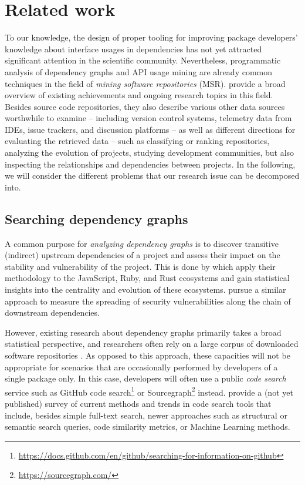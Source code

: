\section{Related work}
\label{sec:related_work}

To our knowledge, the design of proper tooling for improving package developers' knowledge about interface usages in dependencies has not yet attracted significant attention in the scientific community.
Nevertheless, programmatic analysis of dependency graphs and API usage mining are already common techniques in the field of \emph{mining software repositories} (MSR).
\citet{chaturvedi2013tools} provide a broad overview of existing achievements and ongoing research topics in this field.
Besides source code repositories, they also describe various other data sources worthwhile to examine -- including version control systems, telemetry data from IDEs, issue trackers, and discussion platforms -- as well as different directions for evaluating the retrieved data -- such as classifying or ranking repositories, analyzing the evolution of projects, studying development communities, but also inspecting the relationships and dependencies between projects.
In the following, we will consider the different problems that our research issue can be decomposed into.

\subsection{Searching dependency graphs}
\label{sec:related_work/dependencies}

A common purpose for \emph{analyzing dependency graphs} is to discover transitive (indirect) upstream dependencies of a project and assess their impact on the stability and vulnerability of the project.
This is done by \citet{kikas2017structure} which apply their methodology to the JavaScript, Ruby, and Rust ecosystems and gain statistical insights into the centrality and evolution of these ecosystems.
\citet{decan2018impact} pursue a similar approach to measure the spreading of security vulnerabilities along the chain of downstream dependencies.

However, existing research about dependency graphs primarily takes a broad statistical perspective, and researchers often rely on a large corpus of downloaded software repositories \citep{abdalkareem2017developers,katz2020libraries,kikas2017structure}.
As opposed to this approach, these capacities will not be appropriate for scenarios that are occasionally performed by developers of a single package only.
In this case, developers will often use a public \emph{code search} service such as GitHub code search\footnote{\url{https://docs.github.com/en/github/searching-for-information-on-github}} or Sourcegraph\footnote{\url{https://sourcegraph.com/}} instead.
\citet{liu2020opportunities} provide a (not yet published) survey of current methods and trends in code search tools that include, besides simple full-text search, newer approaches such as structural or semantic search queries, code similarity metrics, or Machine Learning methods.

